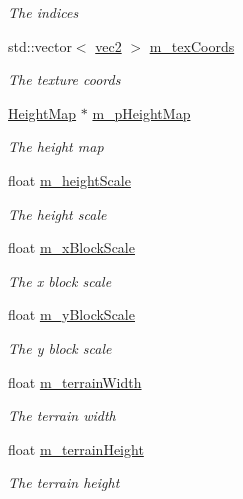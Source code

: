 \begin{DoxyCompactItemize}
\begin{DoxyCompactList}\small\item\em The indices \end{DoxyCompactList}\item 
std\+::vector$<$ \hyperlink{_types_8h_a43182e59794291f6ab00e51b160706c2}{vec2} $>$ \hyperlink{class_terrain_a5b85196bac6771bddd1b99ac51952626}{m\+\_\+tex\+Coords}
\begin{DoxyCompactList}\small\item\em The texture coords \end{DoxyCompactList}\item 
\hyperlink{class_height_map}{Height\+Map} $\ast$ \hyperlink{class_terrain_a1573c3a4a21afe306700bd00e7a9b4f5}{m\+\_\+p\+Height\+Map}
\begin{DoxyCompactList}\small\item\em The height map \end{DoxyCompactList}\item 
float \hyperlink{class_terrain_a63a6588e95aa892d8cd1d7236a7a3870}{m\+\_\+height\+Scale}
\begin{DoxyCompactList}\small\item\em The height scale \end{DoxyCompactList}\item 
float \hyperlink{class_terrain_aa0d137e5e0e7aaa3b348be32d4dc03ad}{m\+\_\+x\+Block\+Scale}
\begin{DoxyCompactList}\small\item\em The x block scale \end{DoxyCompactList}\item 
float \hyperlink{class_terrain_a265cfbe55c45e80dade2f9dfe77d5055}{m\+\_\+y\+Block\+Scale}
\begin{DoxyCompactList}\small\item\em The y block scale \end{DoxyCompactList}\item 
float \hyperlink{class_terrain_ab9424986c9808f8e90d0df6c531ebbf8}{m\+\_\+terrain\+Width}
\begin{DoxyCompactList}\small\item\em The terrain width \end{DoxyCompactList}\item 
float \hyperlink{class_terrain_a58e7994c6f769990ba00bc63d94ab286}{m\+\_\+terrain\+Height}
\begin{DoxyCompactList}\small\item\em The terrain height \end{DoxyCompactList}\item 

\end{DoxyCompactItemize}
